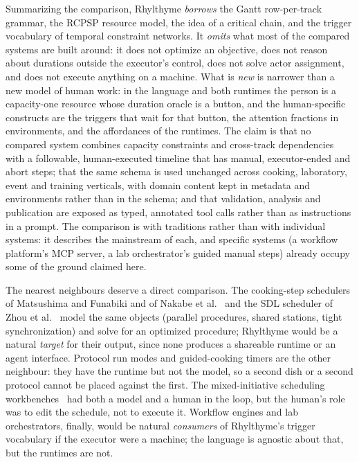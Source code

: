 \documentclass[10pt]{article}
\newcommand{\rt}{Rhylthyme}
\begin{document}
Summarizing the comparison, \rt{} \emph{borrows} the Gantt row-per-track grammar, the RCPSP resource model, the idea of a critical chain, and the trigger vocabulary of temporal constraint networks. It \emph{omits} what most of the compared systems are built around: it does not optimize an objective, does not reason about durations outside the executor's control, does not solve actor assignment, and does not execute anything on a machine. What is \emph{new} is narrower than a new model of human work: in the language and both runtimes the person is a capacity-one resource whose duration oracle is a button, and the human-specific constructs are the triggers that wait for that button, the attention fractions in environments, and the affordances of the runtimes. The claim is that no compared system combines capacity constraints and cross-track dependencies with a followable, human-executed timeline that has manual, executor-ended and abort steps; that the same schema is used unchanged across cooking, laboratory, event and training verticals, with domain content kept in metadata and environments rather than in the schema; and that validation, analysis and publication are exposed as typed, annotated tool calls rather than as instructions in a prompt. The comparison is with traditions rather than with individual systems: it describes the mainstream of each, and specific systems (a workflow platform's MCP server, a lab orchestrator's guided manual steps) already occupy some of the ground claimed here.

The nearest neighbours deserve a direct comparison. The cooking-step schedulers of Matsushima and Funabiki and of Nakabe et al.~\cite{matsushima2015cooking,nakabe2021cooking} and the SDL scheduler of Zhou et al.~\cite{zhou2026sdlscheduling} model the same objects (parallel procedures, shared stations, tight synchronization) and solve for an optimized procedure; \rt{} would be a natural \emph{target} for their output, since none produces a shareable runtime or an agent interface. Protocol run modes and guided-cooking timers are the other neighbour: they have the runtime but not the model, so a second dish or a second protocol cannot be placed against the first. The mixed-initiative scheduling workbenches~\cite{hsu1993macmerl,norbis1996interactive} had both a model and a human in the loop, but the human's role was to edit the schedule, not to execute it. Workflow engines and lab orchestrators, finally, would be natural \emph{consumers} of \rt{}'s trigger vocabulary if the executor were a machine; the language is agnostic about that, but the runtimes are not.
\end{document}
